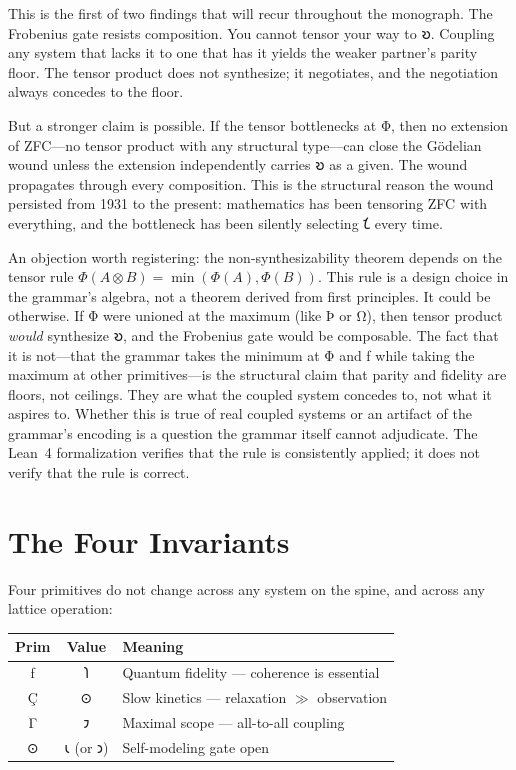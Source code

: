\documentclass[12pt,twoside]{book}
\theoremstyle{definition}
\begin{document}
This is the first of two findings that will recur throughout the monograph. The Frobenius
gate resists composition. You cannot tensor your way to 𐑹. Coupling any system that lacks
it to one that has it yields the weaker partner's parity floor. The tensor product does not
synthesize; it negotiates, and the negotiation always concedes to the floor.

But a stronger claim is possible. If the tensor bottlenecks at Φ, then no extension of
ZFC---no tensor product with any structural type---can close the G\"{o}delian wound unless
the extension independently carries 𐑹 as a given. The wound propagates through every
composition. This is the structural reason the wound persisted from 1931 to the present:
mathematics has been tensoring ZFC with everything, and the bottleneck has been silently
selecting 𐑗 every time.

An objection worth registering: the non-synthesizability theorem depends on the tensor
rule $\Phi(A \otimes B) = \min(\Phi(A), \Phi(B))$. This rule is a design choice in the
grammar's algebra, not a theorem derived from first principles. It could be otherwise. If
Φ were unioned at the maximum (like Þ or Ω), then tensor product \emph{would} synthesize
𐑹, and the Frobenius gate would be composable. The fact that it is not---that the grammar
takes the minimum at Φ and ƒ while taking the maximum at other primitives---is the
structural claim that parity and fidelity are floors, not ceilings. They are what the
coupled system concedes to, not what it aspires to. Whether this is true of real coupled
systems or an artifact of the grammar's encoding is a question the grammar itself cannot
adjudicate. The Lean~4 formalization verifies that the rule is consistently applied; it
does not verify that the rule is correct.

\chapter{The Four Invariants}

Four primitives do not change across any system on the spine, and across any lattice
operation:

\begin{center}
\begin{tabular}{ccp{8cm}}
\toprule
\textbf{Prim} & \textbf{Value} & \textbf{Meaning} \\
\midrule
ƒ & 𐑐 & Quantum fidelity --- coherence is essential \\
Ç & ⊙ & Slow kinetics --- relaxation $\gg$ observation \\
Γ & 𐑲 & Maximal scope --- all-to-all coupling \\
⊙ & 𐑧 (or 𐑮) & Self-modeling gate open \\
\bottomrule
\end{tabular}
\end{center}
\end{document}
